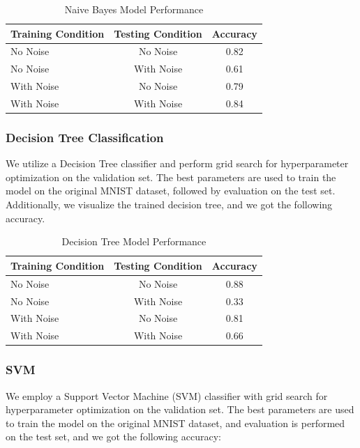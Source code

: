 \documentclass{sbrt}
\begin{document}
\begin{table}[htbp]
  \centering
  \caption{Naive Bayes Model Performance}
    \begin{tabular}{lcc}
    \toprule
    \textbf{Training Condition} & \textbf{Testing Condition} & \textbf{Accuracy} \\
    \midrule
    No Noise & No Noise & 0.82 \\
    No Noise & With Noise & 0.61 \\
    With Noise & No Noise & 0.79 \\
    With Noise & With Noise & 0.84 \\
    \bottomrule
    \end{tabular}%
  \label{tab:addlabel}%
\end{table}%

\subsubsection{Decision Tree Classification}

We utilize a Decision Tree classifier and perform grid search for hyperparameter optimization on the validation set. The best parameters are used to train the model on the original MNIST dataset, followed by evaluation on the test set. Additionally, we visualize the trained decision tree, and we got the following accuracy.

\begin{table}[htbp]
  \centering
  \caption{Decision Tree Model Performance}
    \begin{tabular}{lcc}
    \toprule
    \textbf{Training Condition} & \textbf{Testing Condition} & \textbf{Accuracy} \\
    \midrule
    No Noise & No Noise & 0.88 \\
    No Noise & With Noise & 0.33 \\
    With Noise & No Noise & 0.81 \\
    With Noise & With Noise & 0.66 \\
    \bottomrule
    \end{tabular}%
  \label{tab:addlabel}%
\end{table}%

\subsubsection{SVM}

We employ a Support Vector Machine (SVM) classifier with grid search for hyperparameter optimization on the validation set. The best parameters are used to train the model on the original MNIST dataset, and evaluation is performed on the test set, and we got the following accuracy:
\end{document}
